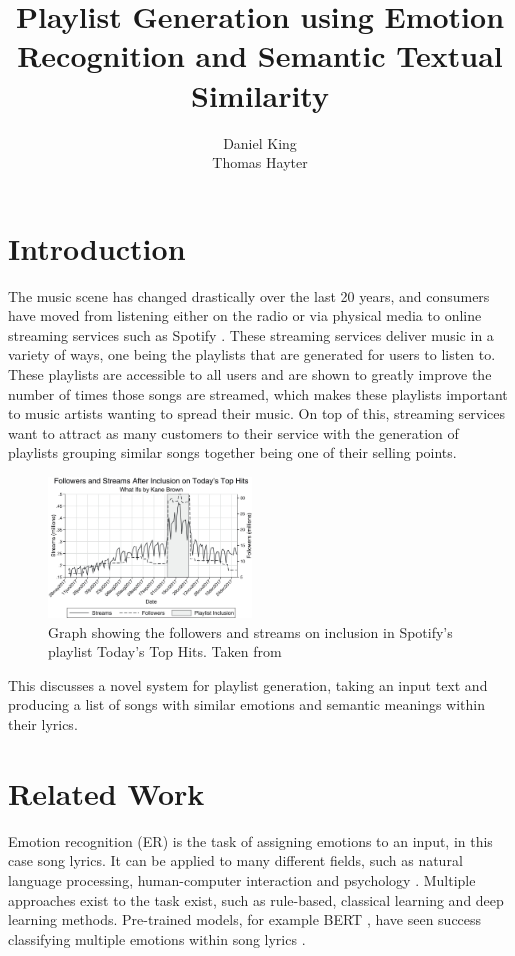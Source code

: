 \documentclass[11pt]{article}
\title{Playlist Generation using Emotion Recognition and Semantic Textual Similarity}
\author{
    Daniel King \\
    \And
    Thomas Hayter \\
}
\begin{document}
\maketitle


\section{Introduction}

The music scene has changed drastically over the last 20 years, and consumers have moved from listening either on the radio or via physical media to online streaming services such as Spotify \cite{streaming}. These streaming services deliver music in a variety of ways, one being the playlists that are generated for users to listen to. These playlists are accessible to all users and are shown to greatly improve the number of times those songs are streamed, which makes these playlists important to music artists wanting to spread their music. On top of this, streaming services want to attract as many customers to their service with the generation of playlists grouping similar songs together being one of their selling points.

\begin{figure}[H]
    \centering
    \includegraphics[width=0.48\textwidth]{images/PlaylistStreams.jpg}
    \caption{Graph showing the followers and streams on inclusion in Spotify's playlist Today's Top Hits. Taken from \cite{playlists}}
\end{figure}

This discusses a novel system for playlist generation, taking an input text and producing a list of songs with similar emotions and semantic meanings within their lyrics. 

\section{Related Work}

Emotion recognition (ER) is the task of assigning emotions to an input, in this case song lyrics. It can be applied to many different fields, such as natural language processing, human-computer interaction and psychology \cite{emotionRecognition}. Multiple approaches exist to the task exist, such as rule-based, classical learning and deep learning methods. Pre-trained models, for example BERT \cite{bert}, have seen success classifying multiple emotions within song lyrics \cite{edmonds-sedoc-2021-multi}.
\end{document}
